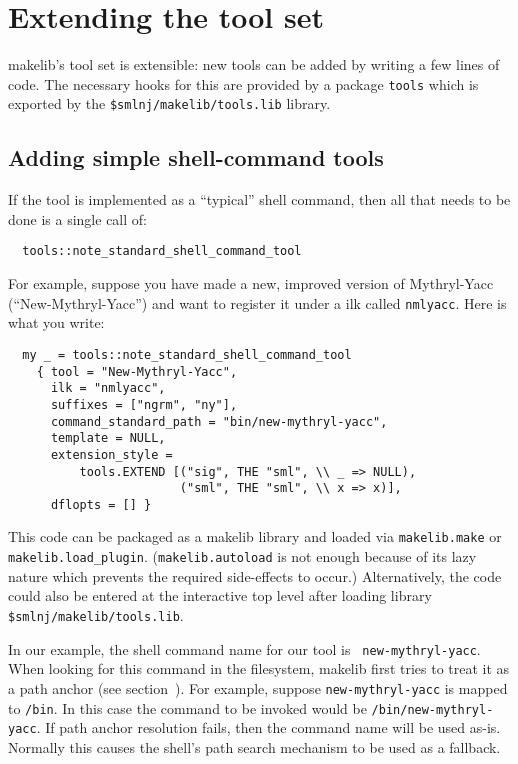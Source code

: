
\section{Extending the tool set}
\label{sec:moretools}

makelib's tool set is extensible: new tools can be added by writing a few
lines of code.  The necessary hooks for this are provided by a
package {\tt tools} which is exported by the {\tt \$smlnj/makelib/tools.lib}
library.

\subsection{Adding simple shell-command tools}
\label{sec:addshellilk}

If the tool is implemented as a ``typical'' shell command, then all
that needs to be done is a single call of:

\begin{verbatim}
  tools::note_standard_shell_command_tool
\end{verbatim}

For example, suppose you have made a
new, improved version of Mythryl-Yacc (``New-Mythryl-Yacc'') and want to
register it under a ilk called {\tt nmlyacc}.  Here is what you
write:

\begin{verbatim}
  my _ = tools::note_standard_shell_command_tool
    { tool = "New-Mythryl-Yacc",
      ilk = "nmlyacc",
      suffixes = ["ngrm", "ny"],
      command_standard_path = "bin/new-mythryl-yacc",
      template = NULL,
      extension_style =
          tools.EXTEND [("sig", THE "sml", \\ _ => NULL),
                        ("sml", THE "sml", \\ x => x)],
      dflopts = [] }
\end{verbatim}

This code can be packaged as a makelib library and loaded via {\tt makelib.make}
or {\tt makelib.load\_plugin}.  ({\tt makelib.autoload} is not enough because of
its lazy nature which prevents the required side-effects to occur.)
Alternatively, the code could also be entered at the interactive top
level after loading library {\tt \$smlnj/makelib/tools.lib}.

In our example, the shell command name for our tool is {\tt
new-mythryl-yacc}.  When looking for this command in the filesystem, makelib
first tries to treat it as a path anchor (see
section~).  For example, suppose {\tt new-mythryl-yacc} is
mapped to {\tt /bin}.  In this case the command to be
invoked would be {\tt /bin/new-mythryl-yacc}.  If path anchor resolution
fails, then the command name will be used as-is.  Normally this
causes the shell's path search mechanism to be used as a fallback.

